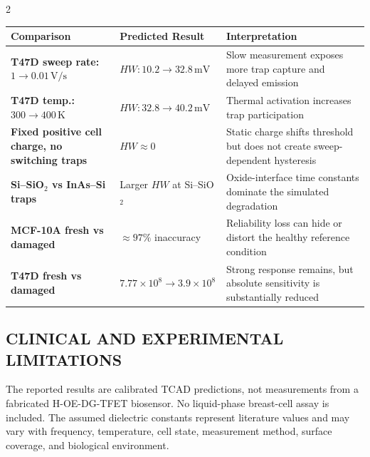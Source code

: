\begin{multicols}{2}
  \noindent\begin{minipage}{\columnwidth}
  \centering
  \footnotesize
    \setlength{\tabcolsep}{2pt}
    \renewcommand{\arraystretch}{1.05}
    \begin{tabular}{@{}>{\bfseries\RaggedRight\arraybackslash}p{}
                        >{\Centering\arraybackslash}p{}
                        >{\RaggedRight\arraybackslash}p{}@{}}
      \toprule
      \textbf{Comparison} & \textbf{Predicted Result} & \textbf{Interpretation} \\
      \midrule
      T47D sweep rate: $1\rightarrow0.01\,\mathrm{V/s}$ & $HW:10.2\rightarrow32.8\,\mathrm{mV}$ & Slow measurement exposes more trap capture and delayed emission \\
      T47D temp.: $300\rightarrow400\,\mathrm{K}$ & $HW:32.8\rightarrow40.2\,\mathrm{mV}$ & Thermal activation increases trap participation \\
      Fixed positive cell charge, no switching traps & $HW\approx0$ & Static charge shifts threshold but does not create sweep-dependent hysteresis \\
      Si--SiO$_2$ vs InAs--Si traps & Larger $HW$ at Si--SiO$_2$ & Oxide-interface time constants dominate the simulated degradation \\
      MCF-10A fresh vs damaged & $\approx 97\%$ inaccuracy & Reliability loss can hide or distort the healthy reference condition \\
      T47D fresh vs damaged & $7.77\times10^8\rightarrow3.9\times10^8$ & Strong response remains, but absolute sensitivity is substantially reduced \\
      \bottomrule
    \end{tabular}
  \end{minipage}
  \vspace{2pt}

  \subsection*{\centering\uppercase{Clinical and Experimental Limitations}}
  The reported results are calibrated TCAD predictions, not measurements from a fabricated H-OE-DG-TFET biosensor. No liquid-phase breast-cell assay is included. The assumed dielectric constants represent literature values and may vary with frequency, temperature, cell state, measurement method, surface coverage, and biological environment.


\end{multicols}

